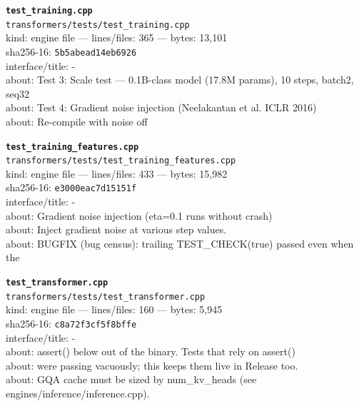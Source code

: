 \noindent\textbf{\texttt{test\_training.cpp}}\\
\texttt{transformers/tests/test\_training.cpp}\\
kind: engine file --- lines/files: 365 --- bytes: 13,101\\
sha256-16: \texttt{5b5abead14eb6926}\\
interface/title: -\\
about: Test 3: Scale test — 0.1B-class model (17.8M params), 10 steps, batch2, seq32\\
about: Test 4: Gradient noise injection (Neelakantan et al. ICLR 2016)\\
about: Re-compile with noise off\\
\vspace*{6.0pt}

\noindent\textbf{\texttt{test\_training\_features.cpp}}\\
\texttt{transformers/tests/test\_training\_features.cpp}\\
kind: engine file --- lines/files: 433 --- bytes: 15,982\\
sha256-16: \texttt{e3000eac7d15151f}\\
interface/title: -\\
about: Gradient noise injection (eta=0.1 runs without crash)\\
about: Inject gradient noise at various step values.\\
about: BUGFIX (bug census): trailing TEST\_CHECK(true) passed even when the\\
\vspace*{6.0pt}

\noindent\textbf{\texttt{test\_transformer.cpp}}\\
\texttt{transformers/tests/test\_transformer.cpp}\\
kind: engine file --- lines/files: 160 --- bytes: 5,945\\
sha256-16: \texttt{c8a72f3cf5f8bffe}\\
interface/title: -\\
about: assert() below out of the binary. Tests that rely on assert()\\
about: were passing vacuously; this keeps them live in Release too.\\
about: GQA cache must be sized by num\_kv\_heads (see engines/inference/inference.cpp).\\
\vspace*{6.0pt}
\newpage

